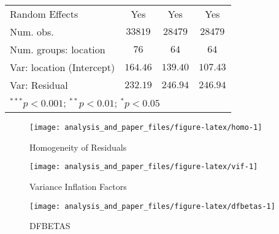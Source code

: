\documentclass[
  12pt,
]{article}
\begin{document}
\begin{table}
\begin{center}
\begin{small}
\begin{tabular}{l c c c}
\hline
Random Effects               & Yes        & Yes        & Yes          \\
Num. obs.                    & $33819$    & $28479$    & $28479$      \\
Num. groups: location        & $76$       & $64$       & $64$         \\
Var: location (Intercept)    & $164.46$   & $139.40$   & $107.43$     \\
Var: Residual                & $232.19$   & $246.94$   & $246.94$     \\
\hline
\multicolumn{4}{l}{\tiny{$^{***}p<0.001$; $^{**}p<0.01$; $^{*}p<0.05$}}
\end{tabular}
\end{small}
\label{tab:obs-test}
\end{center}
\end{table}

\begin{figure}
\texttt{[image: analysis\_and\_paper\_files/figure-latex/homo-1]} \caption{Homogeneity of Residuals}\label{fig:homo}
\end{figure}

\begin{figure}
\texttt{[image: analysis\_and\_paper\_files/figure-latex/vif-1]} \caption{Variance Inflation Factors}\label{fig:vif}
\end{figure}

\begin{figure}
\texttt{[image: analysis\_and\_paper\_files/figure-latex/dfbetas-1]} \caption{DFBETAS}\label{fig:dfbetas}
\end{figure}
\end{document}
